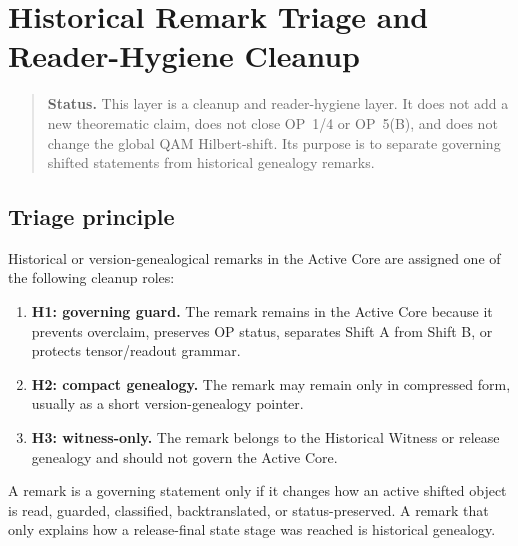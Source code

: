 \section{ Historical Remark Triage and Reader-Hygiene Cleanup}
\label{sec:v401-historical-remark-triage-reader-hygiene-cleanup}

\begin{quote}\small
\noindent\textbf{Status.}
This  layer is a cleanup and reader-hygiene layer. It does not add a new
theorematic claim, does not close OP~1/4 or OP~5(B), and does not change the
 global QAM Hilbert-shift. Its purpose is to separate governing shifted
statements from historical genealogy remarks.
\end{quote}

\subsection{Triage principle}
\label{subsec:v401-triage-principle}

\begin{definition}
\label{def:v401-historical-remark-triage-classes}
Historical or version-genealogical remarks in the Active Core are assigned one
of the following cleanup roles:
\begin{enumerate}[leftmargin=*]
 \item \textbf{H1: governing guard.} The remark remains in the Active Core
 because it prevents overclaim, preserves OP status, separates Shift A from
 Shift B, or protects tensor/readout grammar.
 \item \textbf{H2: compact genealogy.} The remark may remain only in compressed
 form, usually as a short version-genealogy pointer.
 \item \textbf{H3: witness-only.} The remark belongs to the Historical Witness
 or release genealogy and should not govern the Active Core.
\end{enumerate}
\end{definition}

\begin{definition}
\label{def:v401-governing-statement-criterion}
A remark is a governing statement only if it changes how an active shifted object is
read, guarded, classified, backtranslated, or status-preserved. A remark that
only explains how a release-final state stage was reached is historical genealogy.
\end{definition}

